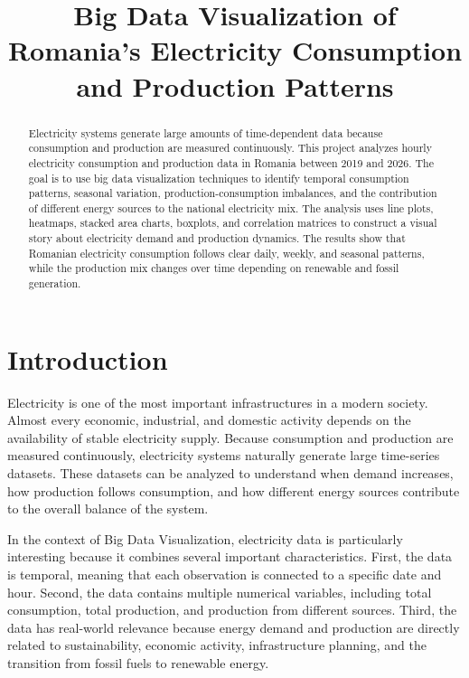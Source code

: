 \documentclass[conference]{IEEEtran}
\title{Big Data Visualization of Romania's Electricity Consumption and Production Patterns}
\author{
\IEEEauthorblockN{Mic-Duna Daniel Alexandru}
\IEEEauthorblockA{
Master of Machine Learning\\
Politehnica University of Timisoara\\
Timisoara, Romania
}
\and
\IEEEauthorblockN{Gîrban Sava}
\IEEEauthorblockA{
Master of Machine Learning\\
Politehnica University of Timisoara\\
Timisoara, Romania
}
}
\begin{document}
\maketitle

\begin{abstract}
Electricity systems generate large amounts of time-dependent data because consumption and production are measured continuously. This project analyzes hourly electricity consumption and production data in Romania between 2019 and 2026. The goal is to use big data visualization techniques to identify temporal consumption patterns, seasonal variation, production-consumption imbalances, and the contribution of different energy sources to the national electricity mix. The analysis uses line plots, heatmaps, stacked area charts, boxplots, and correlation matrices to construct a visual story about electricity demand and production dynamics. The results show that Romanian electricity consumption follows clear daily, weekly, and seasonal patterns, while the production mix changes over time depending on renewable and fossil generation.
\end{abstract}

\section{Introduction}

Electricity is one of the most important infrastructures in a modern society. Almost every economic, industrial, and domestic activity depends on the availability of stable electricity supply. Because consumption and production are measured continuously, electricity systems naturally generate large time-series datasets. These datasets can be analyzed to understand when demand increases, how production follows consumption, and how different energy sources contribute to the overall balance of the system.

In the context of Big Data Visualization, electricity data is particularly interesting because it combines several important characteristics. First, the data is temporal, meaning that each observation is connected to a specific date and hour. Second, the data contains multiple numerical variables, including total consumption, total production, and production from different sources. Third, the data has real-world relevance because energy demand and production are directly related to sustainability, economic activity, infrastructure planning, and the transition from fossil fuels to renewable energy.
\end{document}
